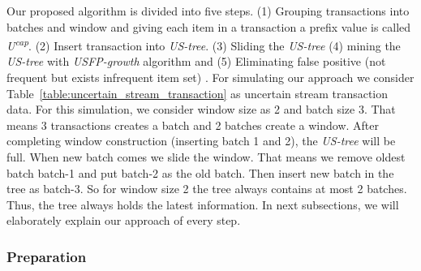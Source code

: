 \documentclass[conference]{IEEEtran}
\begin{document}
Our proposed algorithm is divided into five steps. (1) Grouping transactions into batches and window and giving each item in a transaction a prefix value is called \emph{U\textsuperscript{cap}}. (2) Insert transaction into \emph {US-tree}. (3) Sliding the \emph {US-tree} (4) mining the \emph {US-tree} with \emph{USFP-growth} algorithm and (5) Eliminating false positive (not frequent but exists infrequent item set) . For simulating our approach we consider Table~\ref{table:uncertain_stream_transaction} as uncertain stream transaction data. For this simulation, we consider window size as 2 and batch size 3. That means 3 transactions creates a batch and 2 batches create a window. After completing window construction (inserting batch 1 and 2), the \emph {US-tree} will be full. When new batch comes we slide the window. That means we remove oldest batch batch-1 and put batch-2 as the old batch. Then insert new batch in the tree as batch-3. So for window size 2 the tree always contains at most 2 batches. Thus, the tree always holds the latest information. In next subsections, we will elaborately explain our approach of every step.



\subsubsection{Preparation}
\end{document}
